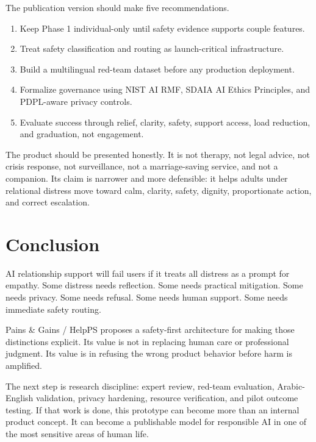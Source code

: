 \documentclass[11pt]{article}
\begin{document}
The publication version should make five recommendations.

\begin{enumerate}
  \item Keep Phase 1 individual-only until safety evidence supports couple features.
  \item Treat safety classification and routing as launch-critical infrastructure.
  \item Build a multilingual red-team dataset before any production deployment.
  \item Formalize governance using NIST AI RMF, SDAIA AI Ethics Principles, and PDPL-aware privacy controls.
  \item Evaluate success through relief, clarity, safety, support access, load reduction, and graduation, not engagement.
\end{enumerate}

The product should be presented honestly. It is not therapy, not legal advice, not crisis response, not surveillance, not a marriage-saving service, and not a companion. Its claim is narrower and more defensible: it helps adults under relational distress move toward calm, clarity, safety, dignity, proportionate action, and correct escalation.

\section{Conclusion}

AI relationship support will fail users if it treats all distress as a prompt for empathy. Some distress needs reflection. Some needs practical mitigation. Some needs privacy. Some needs refusal. Some needs human support. Some needs immediate safety routing.

Pains \& Gains / HelpPS proposes a safety-first architecture for making those distinctions explicit. Its value is not in replacing human care or professional judgment. Its value is in refusing the wrong product behavior before harm is amplified.

The next step is research discipline: expert review, red-team evaluation, Arabic-English validation, privacy hardening, resource verification, and pilot outcome testing. If that work is done, this prototype can become more than an internal product concept. It can become a publishable model for responsible AI in one of the most sensitive areas of human life.



\end{document}
